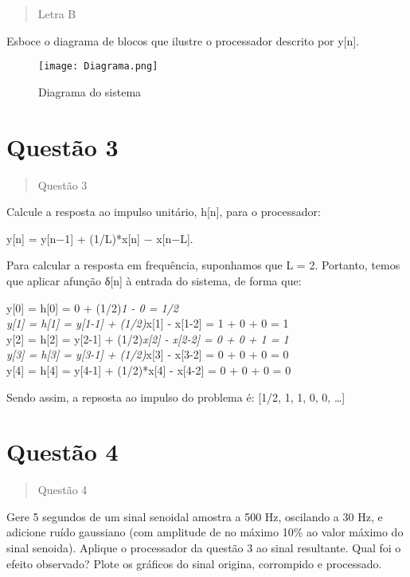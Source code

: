 \documentclass[
]{article}
\begin{document}
\begin{quote}
Letra B
\end{quote}

Esboce o diagrama de blocos que ilustre o processador descrito por
y{[}n{]}.

\begin{figure}
\centering
\texttt{[image: Diagrama.png]}
\caption{Diagrama do sistema}
\end{figure}

\newpage
\section*{Questão 3}

\begin{quote}
Questão 3
\end{quote}

Calcule a resposta ao impulso unitário, h{[}n{]}, para o processador:

y{[}n{]} = y{[}n−1{]} + (1/L)*x{[}n{]} − x{[}n−L{]}.

Para calcular a resposta em frequência, suponhamos que L = 2. Portanto,
temos que aplicar afunção δ{[}n{]} à entrada do sistema, de forma que:

y{[}0{]} = h{[}0{]} = 0 + (1/2)\emph{1 - 0 = 1/2\\
y{[}1{]} = h{[}1{]} = y{[}1-1{]} + (1/2)}x{[}1{]} - x{[}1-2{]} = 1 + 0 +
0 = 1\\
y{[}2{]} = h{[}2{]} = y{[}2-1{]} + (1/2)\emph{x{[}2{]} - x{[}2-2{]} = 0
+ 0 + 1 = 1\\
y{[}3{]} = h{[}3{]} = y{[}3-1{]} + (1/2)}x{[}3{]} - x{[}3-2{]} = 0 + 0 +
0 = 0\\
y{[}4{]} = h{[}4{]} = y{[}4-1{]} + (1/2)*x{[}4{]} - x{[}4-2{]} = 0 + 0 +
0 = 0

Sendo assim, a repsosta ao impulso do problema é: {[}1/2, 1, 1, 0, 0,
\ldots{]}

\newpage
\section*{Questão 4}

\begin{quote}
Questão 4
\end{quote}

Gere 5 segundos de um sinal senoidal amostra a 500 Hz, oscilando a 30
Hz, e adicione ruído gaussiano (com amplitude de no máximo 10\% ao valor
máximo do sinal senoida). Aplique o processador da questão 3 ao sinal
resultante. Qual foi o efeito observado? Plote os gráficos do sinal
origina, corrompido e processado.
\end{document}
